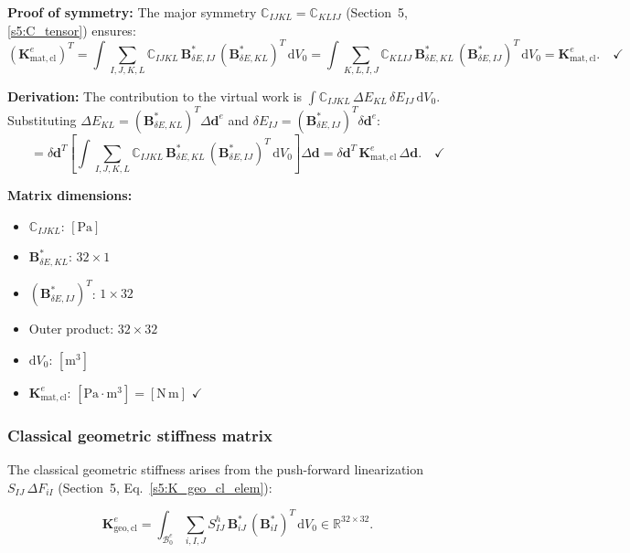 \documentclass[11pt]{article}
\begin{document}
\textbf{Proof of symmetry:}
The major symmetry $\mathbb{C}_{IJKL}=\mathbb{C}_{KLIJ}$
(Section~5, \eqref{s5:C_tensor}) ensures:
\begin{equation}
(\mathbf{K}_{\mathrm{mat,cl}}^{e})^{T}
= \int \sum_{I,J,K,L}
  \mathbb{C}_{IJKL}\,
  \mathbf{B}_{\delta E,IJ}^{*}\,
  (\mathbf{B}_{\delta E,KL}^{*})^{T}\,
  \mathrm{d}V_{0}
= \int \sum_{K,L,I,J}
  \mathbb{C}_{KLIJ}\,
  \mathbf{B}_{\delta E,KL}^{*}\,
  (\mathbf{B}_{\delta E,IJ}^{*})^{T}\,
  \mathrm{d}V_{0}
= \mathbf{K}_{\mathrm{mat,cl}}^{e}. \quad\checkmark
\end{equation}

\textbf{Derivation:}
The contribution to the virtual work is
$\int \mathbb{C}_{IJKL}\,\Delta E_{KL}\,\delta E_{IJ}\,\mathrm{d}V_{0}$.
Substituting $\Delta E_{KL} = (\mathbf{B}_{\delta E,KL}^{*})^{T}\Delta\mathbf{d}^{e}$
and $\delta E_{IJ} = (\mathbf{B}_{\delta E,IJ}^{*})^{T}\delta\mathbf{d}^{e}$:
\begin{equation}
= \delta\mathbf{d}^{T}
  \left[\int \sum_{I,J,K,L} \mathbb{C}_{IJKL}\,
  \mathbf{B}_{\delta E,KL}^{*}\,
  (\mathbf{B}_{\delta E,IJ}^{*})^{T}\,
  \mathrm{d}V_{0}\right]
  \Delta\mathbf{d}
= \delta\mathbf{d}^{T}\,\mathbf{K}_{\mathrm{mat,cl}}^{e}\,\Delta\mathbf{d}. \quad\checkmark
\end{equation}

\textbf{Matrix dimensions:}
\begin{itemize}
\item $\mathbb{C}_{IJKL}$: $[\mathrm{Pa}]$
\item $\mathbf{B}_{\delta E,KL}^{*}$: $32\times 1$
\item $(\mathbf{B}_{\delta E,IJ}^{*})^{T}$: $1\times 32$
\item Outer product: $32\times 32$
\item $\mathrm{d}V_{0}$: $[\mathrm{m}^{3}]$
\item $\mathbf{K}_{\mathrm{mat,cl}}^{e}$: $[\mathrm{Pa}\cdot\mathrm{m}^{3}] = [\mathrm{N\,m}]$ $\checkmark$
\end{itemize}

\subsubsection{Classical geometric stiffness matrix}
\label{ssec:K_geo_cl}

The classical geometric stiffness arises from the push-forward
linearization $S_{IJ}\,\Delta F_{iI}$
(Section~5, Eq.~\eqref{s5:K_geo_cl_elem}):

\begin{equation}
\boxed{
\mathbf{K}_{\mathrm{geo,cl}}^{e}
= \int_{\mathcal{B}_{0}^{e}}
  \sum_{i,I,J}
  S_{IJ}^{h}\,
  \mathbf{B}_{iJ}^{*}\,
  (\mathbf{B}_{iI}^{*})^{T}\,
  \mathrm{d}V_{0}
\in \mathbb{R}^{32\times 32}.
}
\label{s7:K_geo_cl}
\end{equation}
\end{document}
